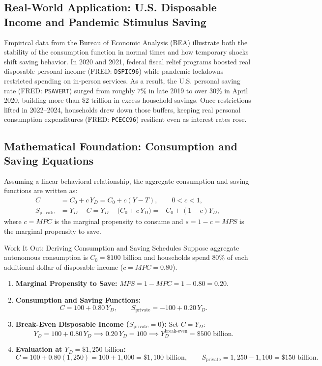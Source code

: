 \documentclass[11pt,letterpaper]{article}
\begin{document}
\subsection*{Real-World Application: U.S. Disposable Income and Pandemic Stimulus Saving}
Empirical data from the Bureau of Economic Analysis (BEA) illustrate both the stability of the consumption function in normal times and how temporary shocks shift saving behavior. In 2020 and 2021, federal fiscal relief programs boosted real disposable personal income (FRED: \texttt{DSPIC96}) while pandemic lockdowns restricted spending on in-person services. As a result, the U.S. personal saving rate (FRED: \texttt{PSAVERT}) surged from roughly 7\% in late 2019 to over 30\% in April 2020, building more than \$2 trillion in excess household savings. Once restrictions lifted in 2022--2024, households drew down those buffers, keeping real personal consumption expenditures (FRED: \texttt{PCECC96}) resilient even as interest rates rose.

\subsection*{Mathematical Foundation: Consumption and Saving Equations}
Assuming a linear behavioral relationship, the aggregate consumption and saving functions are written as:
\begin{align}
C &= C_0 + c\,Y_D = C_0 + c(Y - T), \qquad 0 < c < 1, \label{eq:ch8-consumption} \\
S_{\text{private}} &= Y_D - C = Y_D - \bigl(C_0 + c\,Y_D\bigr) = -C_0 + (1 - c)Y_D, \label{eq:ch8-saving}
\end{align}
where $c = MPC$ is the marginal propensity to consume and $s = 1 - c = MPS$ is the marginal propensity to save.

\begin{examplecase}{Work It Out: Deriving Consumption and Saving Schedules}
Suppose aggregate autonomous consumption is $C_0 = \$100\text{ billion}$ and households spend $80\%$ of each additional dollar of disposable income ($c = MPC = 0.80$).
\begin{enumerate}
    \item \textbf{Marginal Propensity to Save:} $MPS = 1 - MPC = 1 - 0.80 = 0.20$.
    \item \textbf{Consumption and Saving Functions:}
    \[
    C = 100 + 0.80\,Y_D, \qquad S_{\text{private}} = -100 + 0.20\,Y_D.
    \]
    \item \textbf{Break-Even Disposable Income ($S_{\text{private}} = 0$):} Set $C = Y_D$:
    \[
    Y_D = 100 + 0.80\,Y_D \implies 0.20\,Y_D = 100 \implies Y_D^{\text{break-even}} = \$500\text{ billion}.
    \]
    \item \textbf{Evaluation at $Y_D = \$1{,}250\text{ billion}$:}
    \[
    C = 100 + 0.80(1{,}250) = 100 + 1{,}000 = \$1{,}100\text{ billion}, \qquad S_{\text{private}} = 1{,}250 - 1{,}100 = \$150\text{ billion}.
    \]
\end{enumerate}
\end{examplecase}
\end{document}
